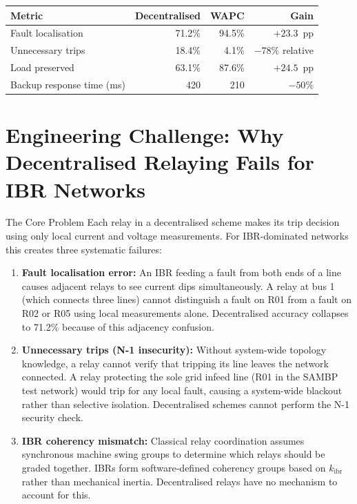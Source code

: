 \documentclass[12pt,a4paper]{article}
\newcommand{\kibr}{k_\mathrm{ibr}}
\begin{document}
\begin{center}
\begin{tabular}{@{}lrrr@{}}
\toprule
\textbf{Metric} & \textbf{Decentralised} & \textbf{WAPC} & \textbf{Gain} \\
\midrule
Fault localisation        & 71.2\%  & 94.5\%  & $+23.3$~pp \\
Unnecessary trips         & 18.4\%  & 4.1\%   & $-78\%$ relative \\
Load preserved            & 63.1\%  & 87.6\%  & $+24.5$~pp \\
Backup response time (ms) & 420     & 210     & $-50\%$ \\
\bottomrule
\end{tabular}
\end{center}

\section{Engineering Challenge: Why Decentralised Relaying Fails for IBR Networks}

\begin{warnbox}{The Core Problem}
Each relay in a decentralised scheme makes its trip decision using only local current and voltage measurements. For IBR-dominated networks this creates three systematic failures:

\begin{enumerate}[nosep]
  \item \textbf{Fault localisation error:} An IBR feeding a fault from both ends of a line causes adjacent relays to see current dips simultaneously. A relay at bus 1 (which connects three lines) cannot distinguish a fault on R01 from a fault on R02 or R05 using local measurements alone. Decentralised accuracy collapses to 71.2\% because of this adjacency confusion.

  \item \textbf{Unnecessary trips (N-1 insecurity):} Without system-wide topology knowledge, a relay cannot verify that tripping its line leaves the network connected. A relay protecting the sole grid infeed line (R01 in the SAMBP test network) would trip for any local fault, causing a system-wide blackout rather than selective isolation. Decentralised schemes cannot perform the N-1 security check.

  \item \textbf{IBR coherency mismatch:} Classical relay coordination assumes synchronous machine swing groups to determine which relays should be graded together. IBRs form software-defined coherency groups based on $\kibr$ rather than mechanical inertia. Decentralised relays have no mechanism to account for this.
\end{enumerate}
\end{warnbox}
\end{document}

